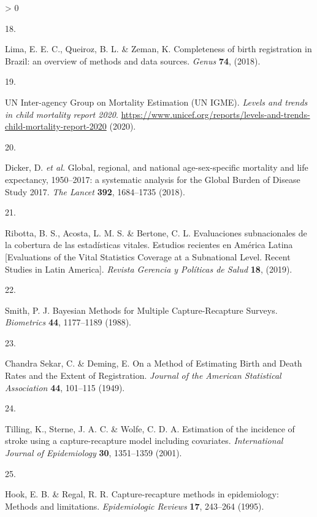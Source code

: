 \documentclass[
]{article}
\newlength{\cslhangindent}
\newlength{\csllabelwidth}
\newenvironment{CSLReferences}[2] %
 {%
  \setlength{\parindent}{0pt}
  \ifodd #1 \everypar{\setlength{\hangindent}{\cslhangindent}}\ignorespaces\fi
  \ifnum #2 > 0
  \setlength{\parskip}{#2\baselineskip}
  \fi
 }%
 {}
\newcommand{\CSLLeftMargin}[1]{\parbox[t]{\csllabelwidth}{#1}}
\newcommand{\CSLRightInline}[1]{\parbox[t]{\linewidth - \csllabelwidth}{#1}\break}
\begin{document}
\begin{CSLReferences}{0}{0}
\leavevmode\hypertarget{ref-Lima2018}{}%
\CSLLeftMargin{18. }
\CSLRightInline{Lima, E. E. C., Queiroz, B. L. \& Zeman, K. {Completeness of birth registration in Brazil: an overview of methods and data sources}. \emph{Genus} \textbf{74}, (2018).}

\leavevmode\hypertarget{ref-UNInter-agencyGrouponMortalityEstimationUNIGME2020}{}%
\CSLLeftMargin{19. }
\CSLRightInline{UN Inter-agency Group on Mortality Estimation (UN IGME). \emph{{Levels and trends in child mortality report 2020}}. \url{https://www.unicef.org/reports/levels-and-trends-child-mortality-report-2020} (2020).}

\leavevmode\hypertarget{ref-Dicker2018}{}%
\CSLLeftMargin{20. }
\CSLRightInline{Dicker, D. \emph{et al.} {Global, regional, and national age-sex-specific mortality and life expectancy, 1950--2017: a systematic analysis for the Global Burden of Disease Study 2017}. \emph{The Lancet} \textbf{392}, 1684--1735 (2018).}

\leavevmode\hypertarget{ref-Ribotta2019}{}%
\CSLLeftMargin{21. }
\CSLRightInline{Ribotta, B. S., Acosta, L. M. S. \& Bertone, C. L. {Evaluaciones subnacionales de la cobertura de las estad{í}sticas vitales. Estudios recientes en Am{é}rica Latina {[}Evaluations of the Vital Statistics Coverage at a Subnational Level. Recent Studies in Latin America{]}}. \emph{Revista Gerencia y Pol{í}ticas de Salud} \textbf{18}, (2019).}

\leavevmode\hypertarget{ref-Smith1988}{}%
\CSLLeftMargin{22. }
\CSLRightInline{Smith, P. J. {Bayesian Methods for Multiple Capture-Recapture Surveys}. \emph{Biometrics} \textbf{44}, 1177--1189 (1988).}

\leavevmode\hypertarget{ref-ChandraSekar1949}{}%
\CSLLeftMargin{23. }
\CSLRightInline{Chandra Sekar, C. \& Deming, E. {On a Method of Estimating Birth and Death Rates and the Extent of Registration}. \emph{Journal of the American Statistical Association} \textbf{44}, 101--115 (1949).}

\leavevmode\hypertarget{ref-Tilling2001a}{}%
\CSLLeftMargin{24. }
\CSLRightInline{Tilling, K., Sterne, J. A. C. \& Wolfe, C. D. A. {Estimation of the incidence of stroke using a capture-recapture model including covariates}. \emph{International Journal of Epidemiology} \textbf{30}, 1351--1359 (2001).}

\leavevmode\hypertarget{ref-Hook1995}{}%
\CSLLeftMargin{25. }
\CSLRightInline{Hook, E. B. \& Regal, R. R. {Capture-recapture methods in epidemiology: Methods and limitations}. \emph{Epidemiologic Reviews} \textbf{17}, 243--264 (1995).}


\end{CSLReferences}
\end{document}
